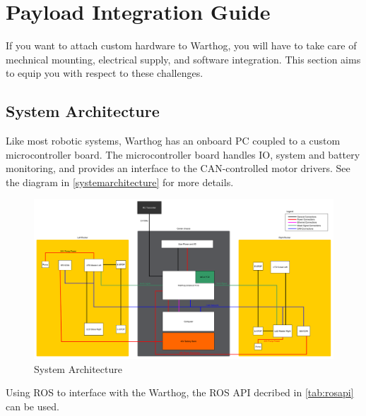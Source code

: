 \documentclass[]{clearpath-latex/clearpath-manual}
\begin{document}
\section{Payload Integration Guide}

If you want to attach custom hardware to Warthog, you will have to take care of mechnical mounting, electrical supply, and software integration.  This section aims to equip you with respect to these challenges.

\subsection{System Architecture}

Like most robotic systems, Warthog has an onboard PC coupled to a custom microcontroller board. The microcontroller board handles IO, system and battery monitoring, and provides an interface to the CAN-controlled motor drivers. See the diagram in \autoref{systemarchitecture} for more details.

\begin{figure}[!htb]
  \centering
  \includegraphics[width=1.0\linewidth]{warthog-logic-conn.pdf}
  \caption{System Architecture}
  \label{systemarchitecture}
\end{figure}

Using ROS to interface with the Warthog, the ROS API decribed in \autoref{tab:rosapi} can be used.
\end{document}
